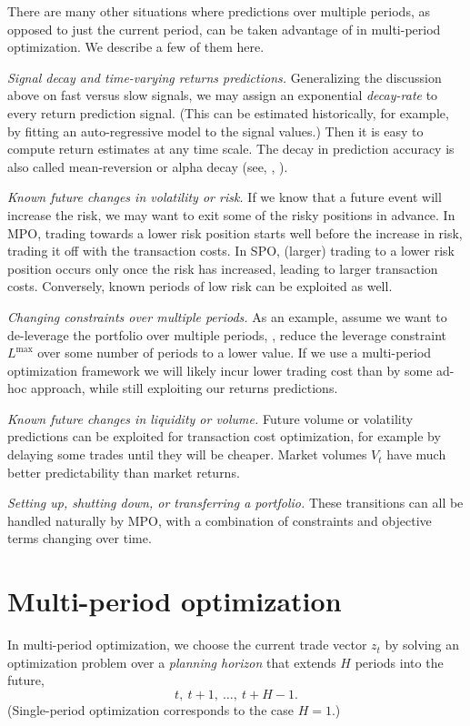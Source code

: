 \documentclass[openany]{article}  %
\begin{document}
There are many other situations where predictions over multiple periods,
as opposed to just the current period, can be taken advantage of in
multi-period optimization.  We describe a few of them here.
\BIT
\item \emph{Signal decay and time-varying returns predictions.}
Generalizing the discussion above on fast versus slow signals,
we may assign an exponential \emph{decay-rate} to every
return prediction signal. (This can be estimated historically,
for example, by fitting an auto-regressive model to the signal values.)
Then it is easy to compute return estimates at any time scale.
The decay in prediction accuracy is also called mean-reversion
or alpha decay (see, \eg, \cite{campbell1997econometrics,grinold2006dynamic,garleanu2013dynamic}).
\item \emph{Known future changes in volatility or risk.}
If we know that a future event will increase the risk, we may want
to exit some of the risky positions in advance.
In MPO, trading
towards a lower risk position starts well before the increase in risk,
trading it off with the transaction costs.
In SPO, (larger) trading to a lower risk position occurs only once the
risk has increased, leading to larger transaction costs.
Conversely, known periods of low risk can be exploited as well.
\item  \emph{Changing constraints over multiple periods.}
As an example, assume we want to de-leverage the portfolio over
multiple periods, \ie, reduce the leverage constraint $L^\mathrm{max}$ over some number
of periods to a lower value.
If we use a multi-period optimization framework we will likely
incur lower trading cost than by some ad-hoc approach,
while still exploiting our returns predictions.
\item  \emph{Known future changes in liquidity or volume.}
Future volume or volatility predictions can be exploited for transaction cost optimization,
for example by delaying some trades until they will be cheaper.
Market volumes $V_t$ have much better predictability than market returns.
\item \emph{Setting up, shutting down, or transferring a portfolio.}
These transitions can all be handled naturally by MPO,
with a combination of constraints and objective terms changing over time.
\EIT

\section{Multi-period optimization}
In multi-period optimization, we choose the current trade vector
$z_t$ by solving
an optimization problem over a \emph{planning horizon}
that extends $H$ periods into the future,
\[
t,~t+1, ~ \ldots, ~ t+H-1.
\]
(Single-period optimization corresponds to the case $H=1$.)
\end{document}
